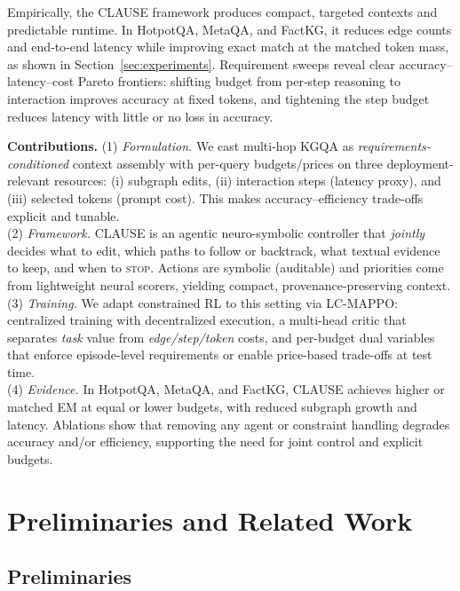 \documentclass{article} %
\newcommand{\method}{\textsc{CLAUSE}\xspace}
\begin{document}
Empirically, the \method framework produces compact, targeted contexts and predictable runtime. In HotpotQA, MetaQA, and FactKG, it reduces edge counts and end‑to‑end latency while improving exact match at the matched token mass, as shown in Section~\ref{sec:experiments}. Requirement sweeps reveal clear accuracy–latency–cost Pareto frontiers: shifting budget from per‑step reasoning to interaction improves accuracy at fixed tokens, and tightening the step budget reduces latency with little or no loss in accuracy.


\textbf{Contributions.} (1) \textit{Formulation.} We cast multi-hop KGQA as \emph{requirements-conditioned} context assembly with per-query budgets/prices on three deployment-relevant resources: (i) subgraph edits, (ii) interaction steps (latency proxy), and (iii) selected tokens (prompt cost). This makes accuracy--efficiency trade-offs explicit and tunable. \\
(2) \textit{Framework.} \method is an agentic neuro-symbolic controller that \emph{jointly} decides what to edit, which paths to follow or backtrack, what textual evidence to keep, and when to \textsc{stop}. Actions are symbolic (auditable) and priorities come from lightweight neural scorers, yielding compact, provenance-preserving context. \\
(3) \textit{Training.} We adapt constrained RL to this setting via LC-MAPPO: centralized training with decentralized execution, a multi-head critic that separates \emph{task} value from \emph{edge/step/token} costs, and per-budget dual variables that enforce episode-level requirements or enable price-based trade-offs at test time. \\
(4) \textit{Evidence.} In HotpotQA, MetaQA, and FactKG, CLAUSE achieves higher or matched EM at equal or lower budgets, with reduced subgraph growth and latency. Ablations show that removing any agent or constraint handling degrades accuracy and/or efficiency, supporting the need for joint control and explicit budgets.




\section{Preliminaries and Related Work}
\label{sec:related}

\subsection{Preliminaries}
\label{sec:preliminaries}
\end{document}
